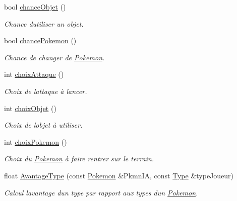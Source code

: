 \begin{DoxyCompactItemize}
bool \hyperlink{class_s_f_m_l_combat_a00370ff45d848befb5d35c52bd1db2d5}{chance\+Objet} ()
\begin{DoxyCompactList}\small\item\em Chance d\textquotesingle{}utiliser un objet. \end{DoxyCompactList}\item 
bool \hyperlink{class_s_f_m_l_combat_a4ba9a6e1f0c91eb425ac83649e443375}{chance\+Pokemon} ()
\begin{DoxyCompactList}\small\item\em Chance de changer de \hyperlink{class_pokemon}{Pokemon}. \end{DoxyCompactList}\item 
int \hyperlink{class_s_f_m_l_combat_ab1f7a0fa82f0cfd9c0a0e1c321f5f7e7}{choix\+Attaque} ()
\begin{DoxyCompactList}\small\item\em Choix de l\textquotesingle{}attaque à lancer. \end{DoxyCompactList}\item 
int \hyperlink{class_s_f_m_l_combat_aa22c1c2665846e97e2eef331af8420d1}{choix\+Objet} ()
\begin{DoxyCompactList}\small\item\em Choix de l\textquotesingle{}objet à utiliser. \end{DoxyCompactList}\item 
int \hyperlink{class_s_f_m_l_combat_a4d5b43087452661e39479026a886d1b6}{choix\+Pokemon} ()
\begin{DoxyCompactList}\small\item\em Choix du \hyperlink{class_pokemon}{Pokemon} à faire rentrer sur le terrain. \end{DoxyCompactList}\item 
float \hyperlink{class_s_f_m_l_combat_a226dd0d639049753aef1fef95cf9a3f0}{Avantage\+Type} (const \hyperlink{class_pokemon}{Pokemon} \&Pkmn\+IA, const \hyperlink{_attaque_8h_a1d1cfd8ffb84e947f82999c682b666a7}{Type} \&type\+Joueur)
\begin{DoxyCompactList}\small\item\em Calcul l\textquotesingle{}avantage d\textquotesingle{}un type par rapport aux types d\textquotesingle{}un \hyperlink{class_pokemon}{Pokemon}. \end{DoxyCompactList}\end{DoxyCompactItemize}
